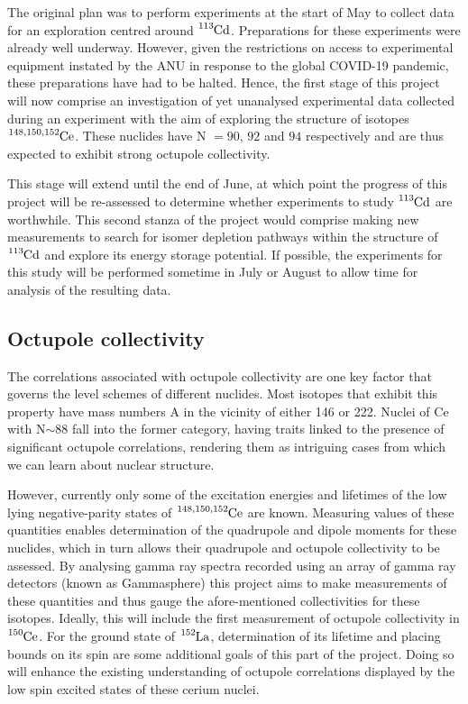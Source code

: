 \documentclass[12pt,a4paper]{article}
\begin{document}
\medskip
The original plan was to perform experiments at the start of May to collect data for an exploration centred around $\ce{^{113}Cd}$. Preparations for these experiments were already well underway. However, given the restrictions on access to experimental equipment instated by the ANU in response to the global COVID-19 pandemic, these preparations have had to be halted. Hence, the first stage of this project will now comprise an investigation of yet unanalysed experimental data collected during an experiment with the aim of exploring the structure of isotopes $\ce{^{148,150,152}Ce}$. These nuclides have N $ = 90$, $92$ and $94$ respectively and are thus expected to exhibit strong octupole collectivity. 

\medskip
This stage will extend until the end of June, at which point the progress of this project will be re-assessed to determine whether experiments to study $\ce{^{113}Cd}$ are worthwhile. This second stanza of the project would comprise making new measurements to search for isomer depletion pathways within the structure of $\ce{^{113}Cd}$ and explore its energy storage potential. If possible, the experiments for this study will be performed sometime in July or August to allow time for analysis of the resulting data.

\subsection*{Octupole collectivity}

\medskip
The correlations associated with octupole collectivity are one key factor that governs the level schemes of different nuclides. Most isotopes that exhibit this property have mass numbers A in the vicinity of either 146 or 222. Nuclei of Ce with N$\sim$88 fall into the former category, having traits linked to the presence of significant octupole correlations, rendering them as intriguing cases from which we can learn about nuclear structure.

\medskip
However, currently only some of the excitation energies and lifetimes of the low lying negative-parity states of $\ce{^{148,150,152}Ce}$ are known. Measuring values of these quantities enables determination of the quadrupole and dipole moments for these nuclides, which in turn allows their quadrupole and octupole collectivity to be assessed. By analysing gamma ray spectra recorded using an array of gamma ray detectors (known as Gammasphere) this project aims to make measurements of these quantities and thus gauge the afore-mentioned collectivities for these isotopes. 
Ideally, this will include the first measurement of octupole collectivity in $\ce{^{150}Ce}$.
For the ground state of $\ce{^{152}La}$, determination of its lifetime and placing bounds on its spin are some additional goals of this part of the project.
Doing so will enhance the existing understanding of octupole correlations displayed by the low spin excited states of these cerium nuclei.
\end{document}
